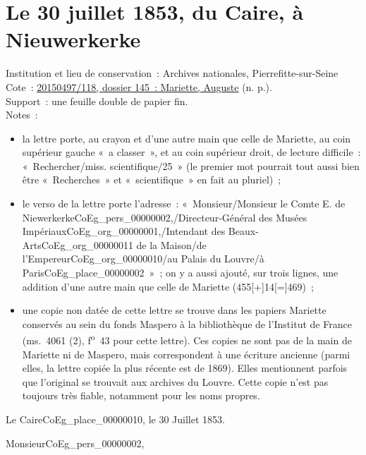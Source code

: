 \documentclass{book}
\begin{document}
\section*{Le 30 juillet 1853, du Caire, à Nieuwerkerke}  
{\footnotesize \noindent Institution et lieu de conservation~: Archives nationales, Pierrefitte-sur-Seine\\
Cote~: \hyperlink{CoEg_Mariette_ms_001}{20150497/118, dossier 145~: Mariette, Auguste} (n. p.).\\
Support~: une feuille double de papier fin.\\
Notes~: \begin{itemize} \item la lettre porte, au crayon et d’une autre main que celle de Mariette, au coin supérieur gauche «~a classer~», et au coin supérieur droit, de lecture difficile~: «~Rechercher/miss. scientifique/25~» (le premier mot pourrait tout aussi bien être «~Recherches~» et «~scientifique~» en fait au pluriel)~; 
\item le verso de la lettre porte l’adresse~: «~Monsieur/Monsieur le Comte E. de Niewerkerke\gls{CoEg_pers_00000002},/Directeur-Général des Musées Impériaux\gls{CoEg_org_00000001},/Intendant des Beaux-Arts\gls{CoEg_org_00000011} de la Maison/de l’Empereur\gls{CoEg_org_00000010}/au Palais du Louvre/à Paris\gls{CoEg_place_00000002}~»~; on y a aussi ajouté, sur trois lignes, une addition d’une autre main que celle de Mariette (455[+]14[=]469)~;
\item une copie non datée de cette lettre se trouve dans les papiers Mariette conservés au sein du fonds Maspero à la bibliothèque de l’Institut de France (ms.~4061 (2), f\textsuperscript{o}~43 pour cette lettre). Ces copies ne sont pas de la main de Mariette ni de Maspero, mais correspondent à une écriture ancienne (parmi elles, la lettre copiée la plus récente est de 1869). Elles mentionnent parfois que l’original se trouvait aux archives du Louvre. Cette copie n’est pas toujours très fiable, notamment pour les noms propres.\end{itemize}}
\begin{flushright}Le Caire\gls{CoEg_place_00000010}, le 30 Juillet 1853.\end{flushright}

\hspace{1cm} Monsieur\gls{CoEg_pers_00000002},\\
\end{document}
